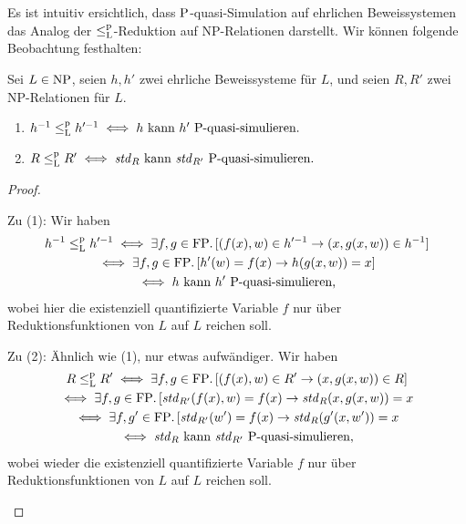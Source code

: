 Es ist intuitiv ersichtlich, dass $\P$-quasi-Simulation auf ehrlichen Beweissystemen das Analog der $\leqlp$-Reduktion auf NP-Relationen darstellt. Wir können folgende Beobachtung festhalten:
\begin{observation}\label{obs:p-quasi-sim-vs-leqlp}
    Sei $L\in\NP$, seien $h, h'$ zwei ehrliche Beweissysteme für $L$, und seien $R, R'$ zwei NP-Relationen für $L$.
    \begin{enumerate}
        \item $h^{-1}\leqlp h'^{-1} \iff \text{$h$ kann $h'$ $\P$-quasi-simulieren.}$
        \item $R\leqlp R' \iff \text{$\mathit{std}_R$ kann $\mathit{std}_{R'}$ $\P$-quasi-simulieren.}$
    \end{enumerate}
\end{observation}
\begin{proof}
    \begin{prooflist}
    \item Zu (1): Wir haben
        \begin{gather*}
            h^{-1}\leqlp h'^{-1} \iff \exists f,g\in\FP.\, [(f(x), w)\in h'^{-1} \rightarrow (x, g(x, w))\in h^{-1}]\\
            \iff \exists f,g\in\FP.\, [h'(w)=f(x) \rightarrow h(g(x, w))=x]\\
            \iff \text{$h$ kann $h'$ $\P$-quasi-simulieren,}
        \end{gather*}
        wobei hier die existenziell quantifizierte Variable $f$ nur über Reduktionsfunktionen von $L$ auf $L$ reichen soll.
    \item Zu (2): Ähnlich wie (1), nur etwas aufwändiger. Wir haben
        \begin{gather*}
            R\leqlp R' \iff \exists f,g\in\FP.\, [(f(x), w)\in R' \rightarrow (x, g(x, w))\in R]\\
            \iff \exists f,g\in\FP.\, [\mathit{std}_{R'}(f(x), w)=f(x) \rightarrow \mathit{std}_R(x, g(x, w))=x\\
            \iff \exists f,g'\in\FP.\, [\mathit{std}_{R'}(w')=f(x) \rightarrow \mathit{std}_R(g'(x, w'))=x\\
            \iff \text{$\mathit{std}_{R}$ kann $\mathit{std}_{R'}$ $\P$-quasi-simulieren,}
        \end{gather*}
        wobei wieder die existenziell quantifizierte Variable $f$ nur über Reduktionsfunktionen von $L$ auf $L$ reichen soll.
    \end{prooflist}
\end{proof}

